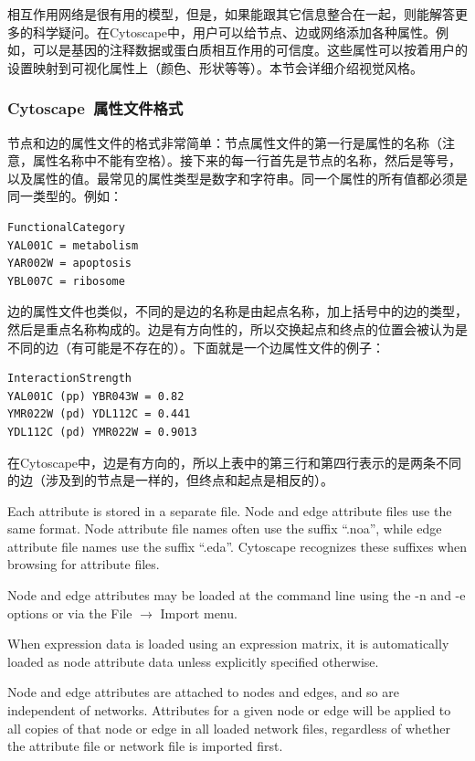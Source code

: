 相互作用网络是很有用的模型，但是，如果能跟其它信息整合在一起，则能解答更多的科学疑问。在Cytoscape中，用户可以给节点、边或网络添加各种属性。例如，可以是基因的注释数据或蛋白质相互作用的可信度。这些属性可以按着用户的设置映射到可视化属性上（颜色、形状等等）。本节会详细介绍视觉风格。

\subsubsection{Cytoscape~属性文件格式}
节点和边的属性文件的格式非常简单：节点属性文件的第一行是属性的名称（注意，属性名称中不能有空格）。接下来的每一行首先是节点的名称，然后是等号，以及属性的值。最常见的属性类型是数字和字符串。同一个属性的所有值都必须是同一类型的。例如：

 \begin{verbatim}
FunctionalCategory
YAL001C = metabolism
YAR002W = apoptosis
YBL007C = ribosome
\end{verbatim}

边的属性文件也类似，不同的是边的名称是由起点名称，加上括号中的边的类型，然后是重点名称构成的。边是有方向性的，所以交换起点和终点的位置会被认为是不同的边（有可能是不存在的）。下面就是一个边属性文件的例子：

 \begin{verbatim}
InteractionStrength
YAL001C (pp) YBR043W = 0.82
YMR022W (pd) YDL112C = 0.441
YDL112C (pd) YMR022W = 0.9013
\end{verbatim}

在Cytoscape中，边是有方向的，所以上表中的第三行和第四行表示的是两条不同的边（涉及到的节点是一样的，但终点和起点是相反的）。


 Each attribute is stored in a separate file. Node and edge attribute files use
the same format. Node attribute file names often use the suffix ``.noa'', while
edge attribute file names use the suffix ``.eda''. Cytoscape recognizes these
suffixes when browsing for attribute files. 

 Node and edge attributes may be loaded at the command line using the -n and -e
options or via the File $\rightarrow$ Import menu. 

 When expression data is loaded using an expression matrix, it is automatically
loaded as node attribute data unless explicitly specified otherwise. 



 Node and edge attributes are attached to nodes and edges, and so are
independent of networks. Attributes for a given node or edge will be applied to
all copies of that node or edge in all loaded network files, regardless of
whether the attribute file or network file is imported first. 

